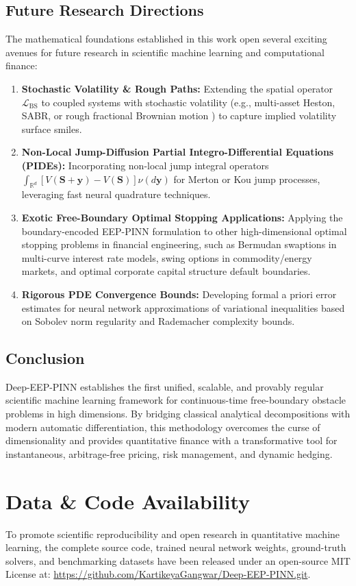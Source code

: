 \documentclass[11pt,a4paper]{article}
\begin{document}
\subsection{Future Research Directions}
The mathematical foundations established in this work open several exciting avenues for future research in scientific machine learning and computational finance:
\begin{enumerate}[label=(\alph*)]
    \item \textbf{Stochastic Volatility \& Rough Paths:} Extending the spatial operator $\mathcal{L}_{\text{BS}}$ to coupled systems with stochastic volatility (e.g., multi-asset Heston, SABR, or rough fractional Brownian motion \cite{sirignano2018dgm}) to capture implied volatility surface smiles.
    \item \textbf{Non-Local Jump-Diffusion Partial Integro-Differential Equations (PIDEs):} Incorporating non-local jump integral operators $\int_{\mathbb{R}^d} [V(\mathbf{S} + \mathbf{y}) - V(\mathbf{S})] \nu(d\mathbf{y})$ for Merton or Kou jump processes, leveraging fast neural quadrature techniques.
    \item \textbf{Exotic Free-Boundary Optimal Stopping Applications:} Applying the boundary-encoded EEP-PINN formulation to other high-dimensional optimal stopping problems in financial engineering, such as Bermudan swaptions in multi-curve interest rate models, swing options in commodity/energy markets, and optimal corporate capital structure default boundaries.
    \item \textbf{Rigorous PDE Convergence Bounds:} Developing formal a priori error estimates for neural network approximations of variational inequalities based on Sobolev norm regularity and Rademacher complexity bounds.
\end{enumerate}

\subsection{Conclusion}
Deep-EEP-PINN establishes the first unified, scalable, and provably regular scientific machine learning framework for continuous-time free-boundary obstacle problems in high dimensions. By bridging classical analytical decompositions with modern automatic differentiation, this methodology overcomes the curse of dimensionality and provides quantitative finance with a transformative tool for instantaneous, arbitrage-free pricing, risk management, and dynamic hedging.

\section*{Data \& Code Availability}
To promote scientific reproducibility and open research in quantitative machine learning, the complete source code, trained neural network weights, ground-truth solvers, and benchmarking datasets have been released under an open-source MIT License at: \url{https://github.com/KartikeyaGangwar/Deep-EEP-PINN.git}.
\end{document}
